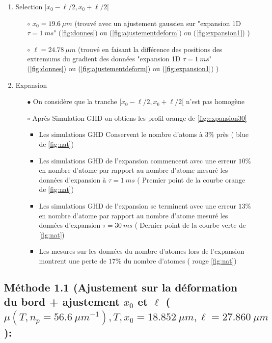 \documentclass[a3, 10pt,twoside]{article}          %
\theoremstyle{plain}
\theoremstyle{definition}
\theoremstyle{remark}
\theoremstyle{definition} %
\def\OliveGreen{OliveGreen}
\begin{document}
\begin{enumerate}[label =\Alph*)]
				\item Selection $[ x_0 - \ell/2 , x_0 + \ell/2[$ 
					\begin{itemize}
								\item[$\circ$] $x_0 = 19.6 ~\mu m $ (trouvé avec un ajustement gaussien sur {\color{OliveGreen}"expansion 1D $\tau =1~ms$" (\ref{fig:donnes})} ou {\color{orange} (\ref{fig:ajustementdeform}) } ou {\color{blue}(\ref{fig:expansion1})} ) 
								\item[$\circ$] $\ell = 24.78 ~ \mu m $ (trouvé en faisant la différence des positions des extremums du gradient des données {\color{OliveGreen}"expansion 1D $\tau =1~ms$" (\ref{fig:donnes})} ou {\color{orange} (\ref{fig:ajustementdeform}) } ou {\color{blue}(\ref{fig:expansion1})} )
							\end{itemize}
				\item Expansion 
					\begin{itemize}
								\item[$\bullet$]	 On considère que la tranche $[ x_0 - \ell/2 , x_0 + \ell/2[$ n'est pas homogène 
								\item[$\circ$] Après Simulation GHD on obtiens les profil {\color{orange} orange de \ref{fig:expansion30}}  
									\begin{itemize}
										\item Les simulations GHD Conservent le nombre d'atoms à $3\%$ près ({\color{blue} blue de \ref{fig:nat}})
										\item Les simulations GHD de l'expansion commencent avec une erreur $10\%$ en nombre d'atome par rapport au nombre d'atome mesuré les données d'expansion à $\tau = 1~ms$ ({\color{orange} Premier point de la courbe orange de \ref{fig:nat}}) 
										\item Les simulations GHD de l'expansion se terminent avec une erreur $13\%$ en nombre d'atome par rapport au nombre d'atome mesuré les données d'expansion $\tau = 30~ms$ ({\color{\OliveGreen} Dernier point de la courbe verte de \ref{fig:nat}})
										\item Les mesures sur les données du nombre d'atomes lors de l'expansion montrent une perte de $17\%$ du nombre d'atomes ({\color{red} rouge \ref{fig:nat}})
									\end{itemize}	 	
							\end{itemize}

			\end{enumerate}
			
			
\subsection{Méthode 1.1 (Ajustement sur la déformation du bord + ajustement $x_0$ et $\ell$ ($\mu( T , n_p = 56.6 ~{\mu m}^{-1} ) , T , x_0 = 18.852 ~\mu m  , \ell = 27.860 ~ \mu m  $ ): } 
		
\end{document}
